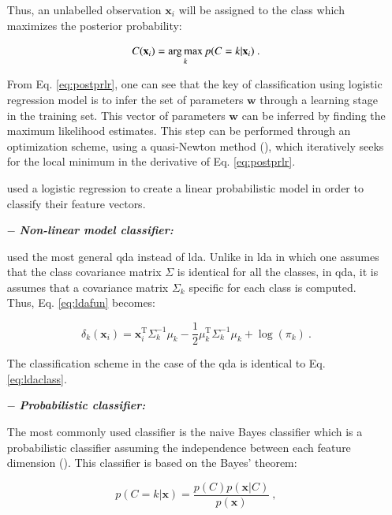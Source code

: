 \begin{enumerate}[leftmargin=*]
Thus, an unlabelled observation $\mathbf{x}_i$ will be assigned to the class which maximizes the posterior probability:

\begin{equation}
	C(\mathbf{x}_i) = \operatorname*{arg\,max}_k p(C=k|\mathbf{x}_i) \ .
	\label{eq:posprobreg}
\end{equation}

From Eq. \eqref{eq:postprlr}, one can see that the key of classification using logistic regression model is to infer the set of parameters $\mathbf{w}$ through a learning stage in the training set. This vector of parameters $\mathbf{w}$ can be inferred by finding the maximum likelihood estimates. This step can be performed through an optimization scheme, using a quasi-Newton method (\cite{Byrd1995}), which iteratively seeks for the local minimum in the derivative of Eq. \eqref{eq:postprlr}.

\cite{Kelm2007,Puech2009} used a logistic regression to create a linear probabilistic model in order to classify their feature vectors.

\item[$-$] \textbf{\textit{Non-linear model classifier:}} 

\cite{Viswanath2012} used the most general \acf{qda} instead of \ac{lda}. Unlike in \ac{lda} in which one assumes that the class covariance matrix $\Sigma$ is identical for all the classes, in \ac{qda}, it is assumes that a covariance matrix $\Sigma_k$ specific for each class is computed. Thus, Eq. \eqref{eq:ldafun} becomes:

\begin{equation}
	\delta_{k}(\mathbf{x}_i) = \mathbf{x}_i^{\text{T}} \Sigma_{k}^{-1} \mu_k - \frac{1}{2} \mu_{k}^{\text{T}} \Sigma_{k}^{-1} \mu_k + \log (\pi_k) \ .
	\label{eq:qdafun}
\end{equation}

The classification scheme in the case of the \ac{qda} is identical to Eq. \eqref{eq:ldaclass}.

\item[$-$] \textbf{\textit{Probabilistic classifier:}}

The most commonly used classifier is the naive Bayes classifier which is a probabilistic classifier assuming the independence between each feature dimension (\cite{Rish2001}). This classifier is based on the Bayes' theorem:

\begin{equation}
	p(C=k|\mathbf{x}) = \frac{p(C)p(\mathbf{x}|C)}{p(\mathbf{x})} \ ,
	\label{eq:bayth}
\end{equation}


\end{enumerate}
